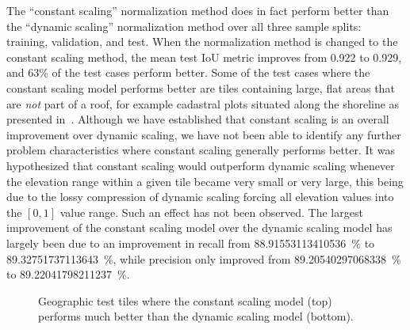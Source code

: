 The \enquote{constant scaling} normalization method does in fact perform better than the \enquote{dynamic scaling} normalization method over all three sample splits: training, validation, and test.
When the normalization method is changed to the constant scaling method, the mean test IoU metric improves from \num{0.922} to \num{0.929}, and 63\% of the test cases perform better.
Some of the test cases where the constant scaling model performs better are tiles containing large, flat areas that are \emph{not} part of a roof, for example cadastral plots situated along the shoreline as presented in~.
Although we have established that constant scaling is an overall improvement over dynamic scaling, we have not been able to identify any further problem characteristics where constant scaling generally performs better.
It was hypothesized that constant scaling would outperform dynamic scaling whenever the elevation range within a given tile became very small or very large, this being due to the lossy compression of dynamic scaling forcing all elevation values into the $[0, 1]$ value range.
Such an effect has not been observed.
The largest improvement of the constant scaling model over the dynamic scaling model has largely been due to an improvement in recall from \SI[round-mode=places,round-precision=2]{88.91553113410536}{\percent} to \SI[round-mode=places,round-precision=2]{89.32751737113643}{\percent}, while precision only improved from \SI[round-mode=places,round-precision=2]{89.20540297068338}{\percent} to \SI[round-mode=places,round-precision=2]{89.22041798211237}{\percent}.

\begin{figure}[H]
  \centering
  \caption{%
    Geographic test tiles where the constant scaling model (top) performs much better than the dynamic scaling model (bottom).
  }%
  \label{fig:constant-better-than-dynamic}
\end{figure}
